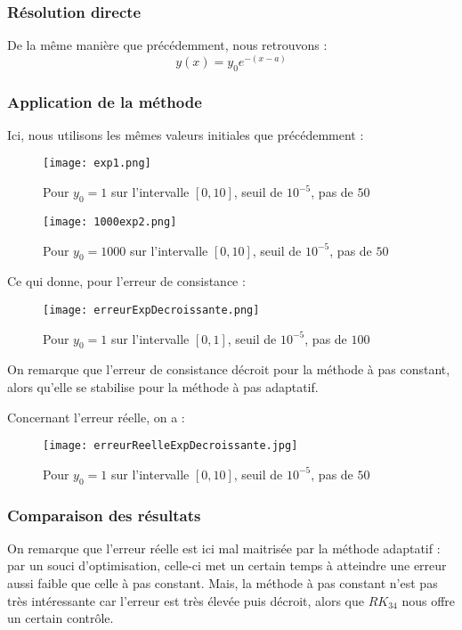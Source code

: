 \documentclass[a4paper, titlepage]{livret} %
\begin{document}
				\subsubsection{Résolution directe}
					De la même manière que précédemment, nous retrouvons :
					\[
						y(x) = y_{0}e^{-(x-a)}
					\]

				\subsubsection{Application de la méthode}
					Ici, nous utilisons les mêmes valeurs initiales que précédemment :

					\begin{figure}[!h]
						\centering
  							\texttt{[image: exp1.png]}
  							\caption{Pour $y_0=1$ sur l'intervalle $[0,10]$, seuil de $10^{-5}$, pas de $50$}
					\end{figure}
	
					\begin{figure}[!h]
						\centering
  							\texttt{[image: 1000exp2.png]}
  							\caption{Pour $y_0=1000$ sur l'intervalle $[0,10]$, seuil de $10^{-5}$, pas de $50$}
					\end{figure}
					\newpage

					Ce qui donne, pour l'erreur de consistance :
					\begin{figure}[!h]
						\centering
  							\texttt{[image: erreurExpDecroissante.png]}
  							\caption{Pour $y_0=1$ sur l'intervalle $[0,1]$, seuil de $10^{-5}$, pas de $100$}
					\end{figure}

					On remarque que l'erreur de consistance décroit pour la méthode à pas constant, alors qu'elle se stabilise pour la méthode à pas adaptatif.

					Concernant l'erreur réelle, on a :
					\begin{figure}[!h]
						\centering
  							\texttt{[image: erreurReelleExpDecroissante.jpg]}
  							\caption{Pour $y_0=1$ sur l'intervalle $[0,10]$, seuil de $10^{-5}$, pas de $50$}
					\end{figure}
					\newpage

				\subsubsection{Comparaison des résultats}
					On remarque que l'erreur réelle est ici mal maitrisée par la méthode adaptatif : par un souci d'optimisation, celle-ci met un certain temps à atteindre une erreur aussi faible que celle à pas constant.
					Mais, la méthode à pas constant n'est pas très intéressante car l'erreur est très élevée puis décroit, alors que $RK_{34}$ nous offre un certain contrôle.
\end{document}
